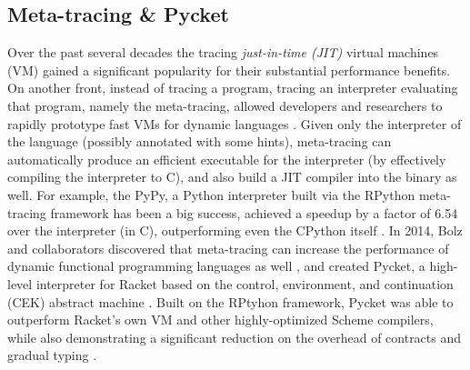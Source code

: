 \subsection{Meta-tracing \& Pycket}
\label{subsec:meta-trace}

Over the past several decades the tracing \emph{just-in-time (JIT)}
virtual machines (VM) gained a significant popularity for their
substantial performance benefits. On another front, instead of tracing
a program, tracing an interpreter evaluating that program, namely the
meta-tracing, allowed developers and researchers to rapidly prototype
fast VMs for dynamic languages \cite{bolz09}. Given only the
interpreter of the language (possibly annotated with some hints),
meta-tracing can automatically produce an efficient executable for the
interpreter (by effectively compiling the interpreter to C), and also
build a JIT compiler into the binary as well. For example, the PyPy, a
Python interpreter built via the RPython meta-tracing framework has
been a big success, achieved a speedup by a factor of 6.54 over the
interpreter (in C), outperforming even the CPython itself
\cite{bolz09}. In 2014, Bolz and collaborators discovered that
meta-tracing can increase the performance of dynamic functional
programming languages as well \cite{bolz14-racket}, and created
Pycket, a high-level interpreter for Racket based on the control,
environment, and continuation (CEK) abstract machine
\cite{felleisen87}. Built on the RPtyhon framework, Pycket was able to
outperform Racket's own VM and other highly-optimized Scheme
compilers, while also demonstrating a significant reduction on the
overhead of contracts and gradual typing \cite{pycket15,pycket17}.
